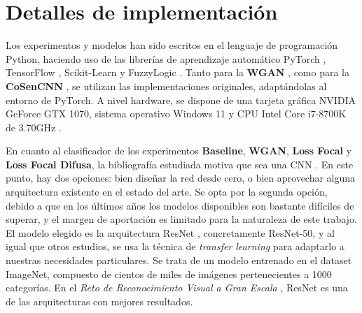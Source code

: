 \section{Detalles de implementación\label{SEC:IMPLEMENTACION}}

Los experimentos y modelos han sido escritos en el lenguaje de programación Python, haciendo uso de las librerías de aprendizaje automático PyTorch \cite{NEURIPS2019_9015}, TensorFlow \cite{tensorflow2015-whitepaper}, Scikit-Learn \cite{scikit-learn} y FuzzyLogic \cite{Kiefner_FuzzyLogic_for_Python_2022}. Tanto para la \textbf{WGAN} \cite{arjovsky2017wasserstein}, como para la \textbf{CoSenCNN} \cite{khan2017cost}, se utilizan las implementaciones originales, adaptándolas al entorno de PyTorch. A nivel hardware, se dispone de una tarjeta gráfica NVIDIA GeForce GTX 1070, sistema operativo Windows 11 y CPU Intel Core i7-8700K de 3.70GHz .

En cuanto al clasificador de los experimentos \textbf{Baseline}, \textbf{WGAN}, \textbf{Loss Focal} y \textbf{Loss Focal Difusa}, la bibliografía estudiada motiva que sea una CNN \cite{wu2020gender,islam2020human,garain2021gra_net,agbo2020deeply,sumi2021human,zhang2020gender}. En este punto, hay dos opciones: bien diseñar la red desde cero, o bien aprovechar alguna arquitectura existente en el estado del arte. Se opta por la segunda opción, debido a que en los últimos años los modelos disponibles son bastante difíciles de superar, y el margen de aportación es limitado para la naturaleza de este trabajo. El modelo elegido es la arquitectura ResNet \cite{he2016deep}, concretamente ResNet-50, y al igual que otros estudios, se usa la técnica de \textit{transfer learning} para adaptarlo a nuestras necesidades particulares. Se trata de un modelo entrenado en el dataset ImageNet, compuesto de cientos de miles de imágenes pertenecientes a 1000 categorías. En el \textit{Reto de Reconocimiento Visual a Gran Escala} \cite{ILSVRC}, ResNet es una de las arquitecturas con mejores resultados.


